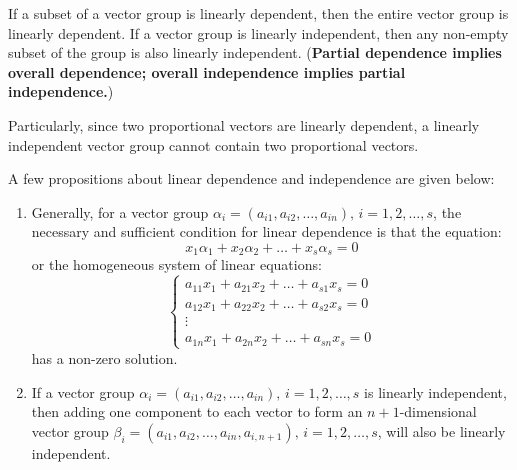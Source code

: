 \documentclass[11pt]{../../TexTemplate/elegantbook} %
\begin{document}
\begin{note}
    If a subset of a vector group is linearly dependent, then the entire vector group is linearly dependent.
    If a vector group is linearly independent, then any non-empty subset of the group is also linearly independent.
    (\textbf{Partial dependence implies overall dependence; overall independence implies partial independence.})
    
    Particularly, since two proportional vectors are linearly dependent, a linearly independent vector group cannot contain two proportional vectors.
\end{note}

A few propositions about linear dependence and independence are given below:
\begin{proposition}\label{proposition:properties_of_linear_independence}
\begin{enumerate}
    \item Generally, for a vector group \( \alpha_i = (a_{i1}, a_{i2}, \dots, a_{in}), \, i = 1, 2, \dots, s \), 
        the necessary and sufficient condition for linear dependence is that the equation:
        \[
        x_1 \alpha_1 + x_2 \alpha_2 + \dots + x_s \alpha_s = 0
        \]
        or the homogeneous system of linear equations:
        \[
        \begin{cases}
        a_{11}x_1 + a_{21}x_2 + \dots + a_{s1}x_s = 0 \\
        a_{12}x_1 + a_{22}x_2 + \dots + a_{s2}x_s = 0 \\
        \vdots \\
        a_{1n}x_1 + a_{2n}x_2 + \dots + a_{sn}x_s = 0
        \end{cases}
        \]
        has a non-zero solution.

    \item  If a vector group \( \alpha_i = (a_{i1}, a_{i2}, \dots, a_{in}), \, i = 1, 2, \dots, s \) 
        is linearly independent, then adding one component to each vector to form an \( n+1 \)-dimensional 
        vector group \( \beta_i = (a_{i1}, a_{i2}, \dots, a_{in}, a_{i,n+1}), \, i = 1, 2, \dots, s \), 
        will also be linearly independent.


\end{enumerate}
\end{proposition}
\end{document}
